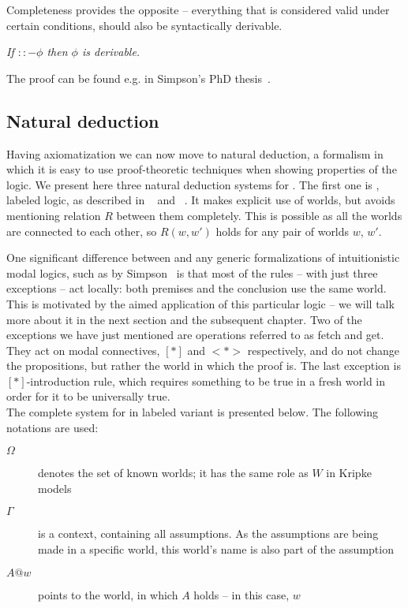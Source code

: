 Completeness provides the opposite -- everything that is considered valid under certain conditions, should also be syntactically derivable.
\begin{theorem}[Completeness]\em
If $::- \phi$ then $\phi$ is derivable.
\end{theorem}
The proof can be found e.g. in Simpson's PhD thesis~\cite{simpson}.


\subsection{Natural deduction}

Having axiomatization we can now move to natural deduction, a formalism in which it is easy to use proof-theoretic techniques when showing properties of the logic. We present here three natural deduction systems for \logic{}. The first one is \logicL{}, labeled logic, as described in ~\cite{labeled} and ~\cite{labeledphd}. It makes explicit use of worlds, but avoids mentioning relation $R$ between them completely. This is possible as all the worlds are connected to each other, so $R(w, w')$ holds for any pair of worlds $w$, $w'$.

One significant difference between \logicL{} and any generic formalizations of intuitionistic modal logics, such as by Simpson~\cite{simpson} is that most of the rules -- with just three exceptions -- act locally: both premises and the conclusion use the same world. This is motivated by the aimed application of this particular logic -- we will talk more about it in the next section and the subsequent chapter.  Two of the exceptions we have just mentioned are operations referred to as fetch and get. They act on modal connectives, $[*]$ and $<*>$ respectively, and do not change the propositions, but rather the world in which the proof is. The last exception is $[*]$-introduction rule, which requires something to be true in a fresh world in order for it to be universally true.\\

The complete \ND{} system for \logic{} in labeled variant is presented below. The following notations are used:
\begin{description}
\item[$\Omega$] denotes the set of known worlds; it has the same role as $W$ in Kripke models
\item[$\Gamma$] is a context, containing all assumptions. As the assumptions are being made in a specific world, this world's name is also part of the assumption
\item[$A @ w$] points to the world, in which $A$ holds -- in this case, $w$
\end{description}

